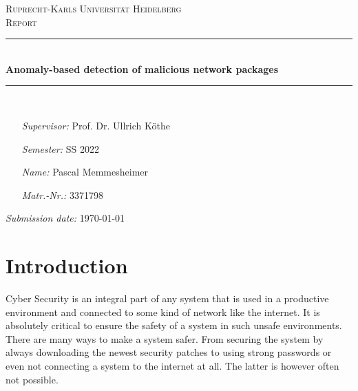 \documentclass[]{article}
\begin{document}
	
	\begin{titlepage}
		\thispagestyle{empty}
		\newcommand{\HRule}{\rule{\linewidth}{0.5mm}}
		\hspace{1cm}
		\center
		
		\textsc{\huge Ruprecht-Karls Universität Heidelberg}\\[2.0cm]
		
		\textsc{\Large Report}\\[1.0cm]
		
		\HRule\\[1.4cm]
		
		{ \huge \bfseries Anomaly-based detection of malicious network packages}\\[0.8cm]
		\HRule \\[8.4cm]
		
		
		\begin{minipage}[t]{0.8\textwidth}
			\begin{itemize}
				\item[\emph{Supervisor:}] Prof. Dr. Ullrich Köthe
				\item[\emph{Semester:}] SS 2022
				\item[\emph{Name:}] Pascal Memmesheimer
				\item[\emph{Matr.-Nr.:}] 3371798
			\end{itemize}
		\end{minipage}
		
		\vspace{2.5cm}
		
		\flushright \emph{Submission date:} \today
	\end{titlepage}
	\restoregeometry
	
	\tableofcontents
	
	\newpage

	\section{Introduction}

	Cyber Security is an integral part of any system that is used in a productive environment and connected to some kind of network like the internet. It is absolutely critical to ensure the safety of a system in such unsafe environments. There are many ways to make a system safer. From securing the system by always downloading the newest security patches to using strong passwords or even not connecting a system to the internet at all. The latter is however often not possible. 
	\newline
	
\end{document}
